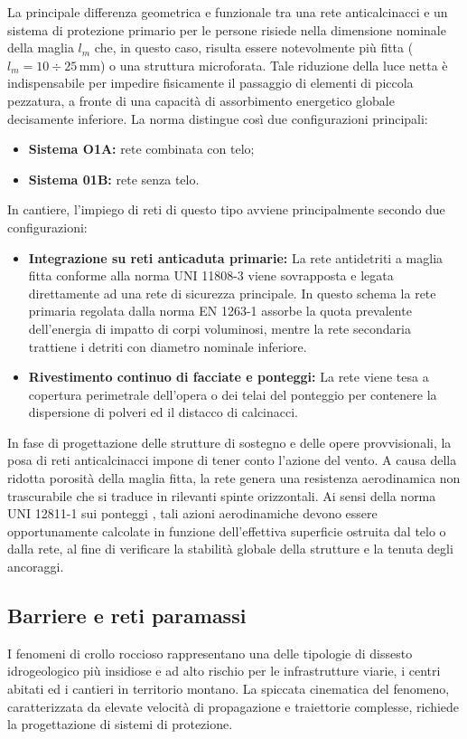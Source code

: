 La principale differenza geometrica e funzionale tra una rete anticalcinacci e un sistema di protezione primario per le persone risiede nella dimensione nominale della maglia $l_m$ che, in questo caso, risulta essere notevolmente più fitta ($l_m = 10 \div 25 \, \text{mm}$) o una struttura microforata. Tale riduzione della luce netta è indispensabile per impedire fisicamente il passaggio di elementi di piccola pezzatura, a fronte di una capacità di assorbimento energetico globale decisamente inferiore. La norma distingue così due configurazioni principali: 
\begin{itemize}
    \item \textbf{Sistema O1A:} rete combinata con telo;
    \item \textbf{Sistema 01B:} rete senza telo.
\end{itemize}

In cantiere, l'impiego di reti di questo tipo avviene principalmente secondo due configurazioni:
\begin{itemize}
    \item \textbf{Integrazione su reti anticaduta primarie:} La rete antidetriti a maglia fitta conforme alla norma UNI 11808-3 \cite{UNI11808-3} viene sovrapposta e legata direttamente ad una rete di sicurezza principale. In questo schema la rete primaria regolata dalla norma EN 1263-1 \cite{EN1263-1} assorbe la quota prevalente dell'energia di impatto di corpi voluminosi, mentre la rete secondaria trattiene i detriti con diametro nominale inferiore.
    \item \textbf{Rivestimento continuo di facciate e ponteggi:} La rete viene tesa a copertura perimetrale dell'opera o dei telai del ponteggio per contenere la dispersione di polveri ed il distacco di calcinacci.
\end{itemize}

In fase di progettazione delle strutture di sostegno e delle opere provvisionali, la posa di reti anticalcinacci impone di tener conto l'azione del vento. A causa della ridotta porosità della maglia fitta, la rete genera una resistenza aerodinamica non trascurabile che si traduce in rilevanti spinte orizzontali. Ai sensi della norma UNI 12811-1 sui ponteggi \cite{UNI12811-1}, tali azioni aerodinamiche devono essere opportunamente calcolate in funzione dell'effettiva superficie ostruita dal telo o dalla rete, al fine di verificare la stabilità globale della strutture e la tenuta degli ancoraggi.

\subsection{Barriere e reti paramassi}
I fenomeni di crollo roccioso rappresentano una delle tipologie di dissesto idrogeologico più insidiose e ad alto rischio per le infrastrutture viarie, i centri abitati ed i cantieri in territorio montano. La spiccata cinematica del fenomeno, caratterizzata da elevate velocità di propagazione e traiettorie complesse, richiede la progettazione di sistemi di protezione. 

